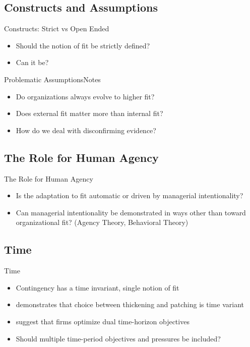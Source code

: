 \documentclass{beamer}
\begin{document}
\subsection{Constructs and Assumptions}
\begin{frame}{Constructs: Strict vs Open Ended}
\begin{itemize}
\item{Should the notion of fit be strictly defined?}
\item<2->{Can it be?}
\end{itemize}
\end{frame}

\begin{frame}{Problematic Assumptions}{Notes}
\begin{itemize}
\item{Do organizations  always evolve to higher fit\citep{Payne2006}?}
\item{Does external fit matter more than internal fit?}
\item<2->{How do we deal with disconfirming evidence\citep{Menz2014}?}
\end{itemize}
\end{frame}

\subsection{The Role for Human Agency}

\begin{frame}{The Role for Human Agency}{}
\begin{itemize}
\item{Is the adaptation to fit automatic or driven by managerial intentionality?}
\item<2->{Can managerial intentionality be demonstrated in ways other than toward organizational fit? (Agency Theory, Behavioral Theory)}
\end{itemize}
\end{frame}

\subsection{Time}
\begin{frame}{Time}{}
\begin{itemize}
\item{Contingency has a time invariant, single notion of fit}
\item{\cite{Siggelkow2002} demonstrates that choice between thickening and patching is time variant}
\item{\cite{Smith2011} suggest that firms optimize dual time-horizon objectives}
\item<2->{Should multiple time-period objectives and pressures be included?}
\end{itemize}
\end{frame}
\end{document}
